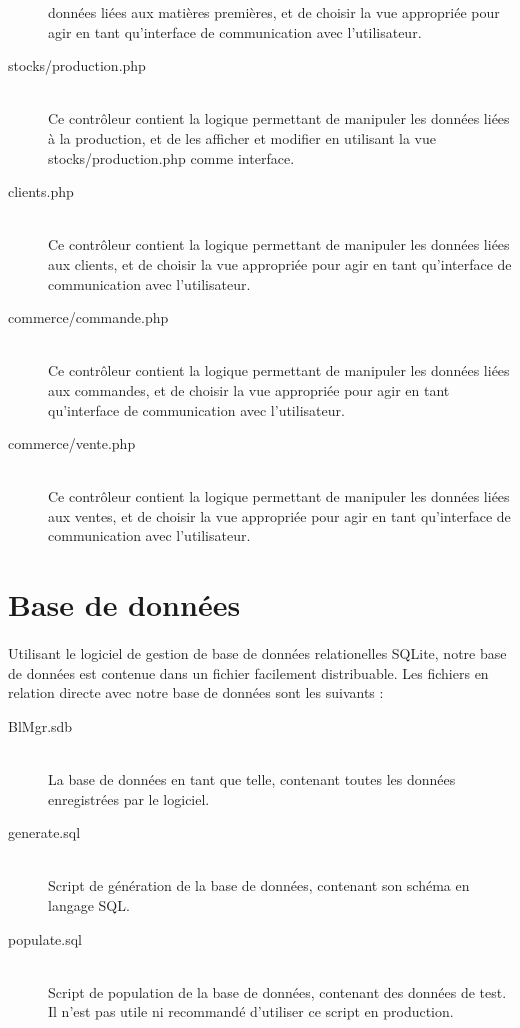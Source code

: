 \begin{description}
                données liées aux matières premières, et de choisir la vue
                appropriée pour agir en tant qu'interface de communication
                avec l'utilisateur.
            \item[stocks/production.php]\hfill \\
                Ce contrôleur contient la logique permettant de manipuler les
                données liées à la production, et de les afficher et modifier
                en utilisant la vue stocks/production.php comme interface.
            \item[clients.php]\hfill \\
                Ce contrôleur contient la logique permettant de manipuler les
                données liées aux clients, et de choisir la vue appropriée
                pour agir en tant qu'interface de communication avec
                l'utilisateur.
            \item[commerce/commande.php]\hfill \\
                Ce contrôleur contient la logique permettant de manipuler les
                données liées aux commandes, et de choisir la vue appropriée
                pour agir en tant qu'interface de communication avec
                l'utilisateur.
            \item[commerce/vente.php]\hfill \\
                Ce contrôleur contient la logique permettant de manipuler les
                données liées aux ventes, et de choisir la vue appropriée pour
                agir en tant qu'interface de communication avec l'utilisateur.
        \end{description}

\section{Base de données}
    \paragraph{}
        Utilisant le logiciel de gestion de base de données relationelles
        SQLite, notre base de données est contenue dans un fichier facilement
        distribuable.
        Les fichiers en relation directe avec notre base de données sont les
        suivants :
        \begin{description}
            \item[BlMgr.sdb]\hfill \\
                La base de données en tant que telle, contenant toutes les
                données enregistrées par le logiciel.
            \item[generate.sql]\hfill \\
                Script de génération de la base de données, contenant son
                schéma en langage SQL.
            \item[populate.sql]\hfill \\
                Script de population de la base de données, contenant des
                données de test.
                Il n'est pas utile ni recommandé d'utiliser ce script en
                production.
        \end{description}
